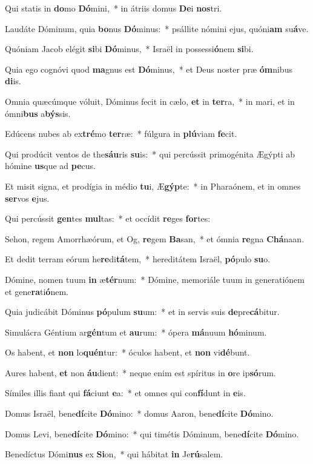 \item Qui statis in \textbf{do}mo \textbf{Dó}mini,~* in átriis domus \textbf{De}i \textbf{nos}tri.
\item Laudáte Dóminum, quia \textbf{bo}nus \textbf{Dó}minus:~* psállite nómini ejus, quóni\textbf{am} su\textbf{á}ve.
\item Quóniam Jacob elégit \textbf{si}bi \textbf{Dó}minus,~* Israël in possessi\textbf{ó}nem \textbf{si}bi.
\item Quia ego cognóvi quod \textbf{ma}gnus est \textbf{Dó}minus,~* et Deus noster præ \textbf{óm}nibus \textbf{di}is.
\item Omnia quæcúmque vóluit, Dóminus fecit in cælo, \textbf{et} in \textbf{ter}ra,~* in mari, et in ómni\textbf{bus} a\textbf{býs}sis.
\item Edúcens nubes ab ex\textbf{tré}mo \textbf{ter}ræ:~* fúlgura in \textbf{plú}viam \textbf{fe}cit.
\item Qui prodúcit ventos de the\textbf{sáu}ris \textbf{su}is:~* qui percússit primogénita Ægýpti ab hómine \textbf{us}que ad \textbf{pe}cus.
\item Et misit signa, et prodígia in médio \textbf{tu}i, Æ\textbf{gýp}te:~* in Pharaónem, et in omnes \textbf{ser}vos \textbf{e}jus.
\item Qui percússit \textbf{gen}tes \textbf{mul}tas:~* et occídit \textbf{re}ges \textbf{for}tes:
\item Sehon, regem Amorrhæórum, et Og, \textbf{re}gem \textbf{Ba}san,~* et ómnia \textbf{re}gna \textbf{Chá}naan.
\item Et dedit terram eórum he\textbf{re}di\textbf{tá}tem,~* hereditátem Israël, \textbf{pó}pulo \textbf{su}o.
\item Dómine, nomen tuum \textbf{in} æ\textbf{tér}num:~* Dómine, memoriále tuum in generatiónem et gene\textbf{ra}ti\textbf{ó}nem.
\item Quia judicábit Dóminus \textbf{pó}pulum \textbf{su}um:~* et in servis suis \textbf{de}pre\textbf{cá}bitur.
\item Simulácra Géntium ar\textbf{gén}tum et \textbf{au}rum:~* ópera \textbf{má}nuum \textbf{hó}minum.
\item Os habent, et \textbf{non} lo\textbf{quén}tur:~* óculos habent, et \textbf{non} vi\textbf{dé}bunt.
\item Aures habent, \textbf{et} non \textbf{áu}dient:~* neque enim est spíritus in \textbf{o}re ip\textbf{só}rum.
\item Símiles illis fiant qui \textbf{fá}ciunt \textbf{e}a:~* et omnes qui con\textbf{fí}dunt in \textbf{e}is.
\item Domus Israël, bene\textbf{dí}cite \textbf{Dó}mino:~* domus Aaron, bene\textbf{dí}cite \textbf{Dó}mino.
\item Domus Levi, bene\textbf{dí}cite \textbf{Dó}mino:~* qui timétis Dóminum, bene\textbf{dí}cite \textbf{Dó}mino.
\item Benedíctus Dómi\textbf{nus} ex \textbf{Si}on,~* qui hábitat \textbf{in} Je\textbf{rú}salem.
